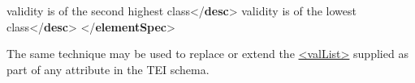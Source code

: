 \begin{shaded}
\hspace*{1em}\hspace*{1em}\hspace*{1em}\mbox{}\newline 
\hspace*{1em}\hspace*{1em}\hspace*{1em}\mbox{}\newline 
\hspace*{1em}\hspace*{1em}\hspace*{1em}\hspace*{1em}validity is of the second highest class{</\textbf{desc}>}\mbox{}\newline 
\hspace*{1em}\hspace*{1em}\hspace*{1em}\mbox{}\newline 
\hspace*{1em}\hspace*{1em}\hspace*{1em}\mbox{}\newline 
\hspace*{1em}\hspace*{1em}\hspace*{1em}\hspace*{1em}validity is of the lowest class{</\textbf{desc}>}\mbox{}\newline 
\hspace*{1em}\hspace*{1em}\hspace*{1em}\mbox{}\newline 
\hspace*{1em}\hspace*{1em}\mbox{}\newline 
\hspace*{1em}\mbox{}\newline 
{}\mbox{}\newline 
{</\textbf{elementSpec}>}\end{shaded}\egroup\par \par
The same technique may be used to replace or extend the \hyperref[TEI.valList]{<valList>} supplied as part of any attribute in the TEI schema.
